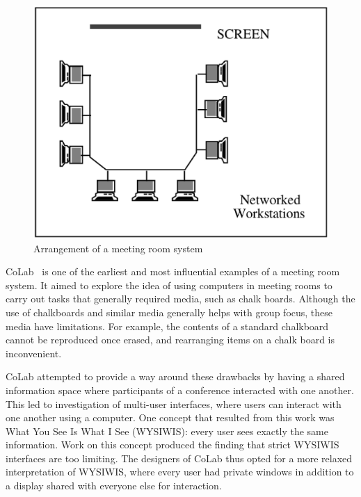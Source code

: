 \begin{figure}[htp]
  \centering
  \includegraphics[scale=.5]{meeting_room_sys.eps}
  \caption{Arrangement of a meeting room system\cite{journals/iwc/Rodden91}}
  \label{meeting_room_fig}
\end{figure}



CoLab~\cite{Stefik:1987:BCU} is one of the earliest and most
influential examples of a meeting room system. It aimed to explore the
idea of using computers in meeting rooms to carry out tasks that
generally required media, such as chalk boards. Although the use of
chalkboards and similar media generally helps with group focus, these
media have limitations.  For example, the contents of a standard
chalkboard cannot be reproduced once erased, and rearranging items on
a chalk board is inconvenient.

CoLab attempted to provide a way around these drawbacks by having a
shared information space where participants of a conference interacted
with one another. This led to investigation of multi-user interfaces,
where users can interact with one another using a computer.  One
concept that resulted from this work was What You See Is What I See
(WYSIWIS): every user sees exactly the same information.  Work on this
concept produced the finding that strict WYSIWIS interfaces are too
limiting.  The designers of CoLab thus opted for a more relaxed
interpretation of WYSIWIS, where every user had private windows in
addition to a display shared with everyone else for interaction.


